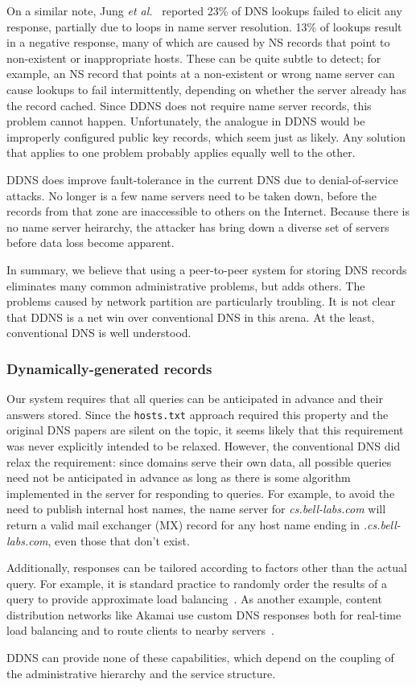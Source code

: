 On a similar note, Jung {\it et al.}~\cite{dnscache:sigcommimw01} 
reported 23\% of 
DNS lookups failed to elicit any response, partially due to loops 
in name server resolution. 13\% of lookups result in a negative 
response, many of which are caused by NS records that point to 
non-existent or inappropriate hosts.
These can be quite subtle to detect; for example, an NS record that points
at a non-existent or wrong name server can cause lookups to fail
intermittently, depending on whether the server already has the 
record cached.
Since DDNS does not require name server records, this problem cannot happen.
Unfortunately, the analogue in DDNS would be improperly
configured public key records, which seem just as likely.
Any solution that applies to one problem
probably applies equally well to the other.

DDNS does improve fault-tolerance in the current DNS due to 
denial-of-service attacks. No longer is a few name servers need
to be taken down, before the records from that zone 
are inaccessible to others on the Internet. Because there is no 
name server heirarchy, the attacker has bring down a diverse
set of servers before data loss become apparent.

In summary, we believe that using a peer-to-peer system for
storing DNS records eliminates many common administrative
problems, but adds others.
The problems caused by network partition are particularly troubling.
It is not clear that DDNS is a net win over conventional DNS in
this arena.  At the least, conventional DNS is well understood.

\subsubsection{Dynamically-generated records}

Our system requires that all queries
can be anticipated in advance and their answers stored.
Since the {\tt hosts.txt} approach required this property
and the original DNS papers are silent on the topic,
it seems likely that this requirement was never 
explicitly intended to be relaxed.
However, the conventional DNS did relax the requirement:
since domains serve their own data, all possible queries need 
not be anticipated in advance as long as there is some algorithm
implemented in the server for responding to queries.
For example, to avoid the need to publish internal host names,
the name server for
{\em cs.bell-labs.com} will return a valid mail exchanger (MX) record
for any host name ending in {\em .cs.bell-labs.com}, even
those that don't exist.

Additionally, responses can be tailored according to factors
other than the actual query.
For example, it is standard practice to randomly order the results
of a query to provide approximate load balancing~\cite{dns-load:rfc}.
As another example, content distribution networks like Akamai
use custom DNS responses both for real-time load balancing and
to route clients to nearby servers~\cite{akamai.rev.eng}.

DDNS can provide none of these capabilities, which depend
on the coupling of the administrative hierarchy and the service structure.


